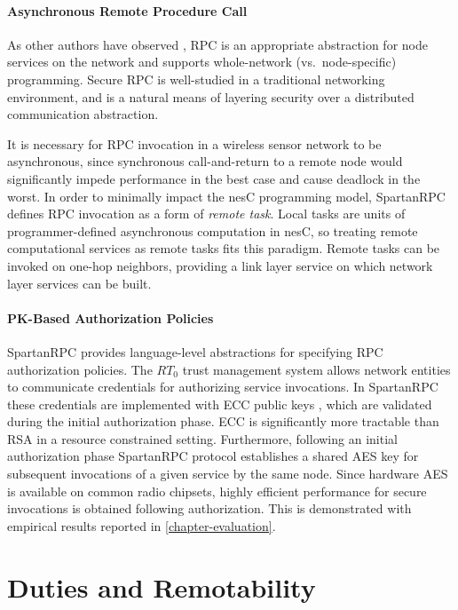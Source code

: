 \paragraph{Asynchronous Remote Procedure Call} As other authors have observed
\cite{may-tinyrpc-2007}, RPC is an appropriate abstraction for node services on the network and
supports whole-network (vs.~node-specific) programming. Secure RPC is well-studied in a
traditional networking environment, and is a natural means of layering security over a
distributed communication abstraction.

It is necessary for RPC invocation in a wireless sensor network to be asynchronous, since
synchronous call-and-return to a remote node would significantly impede performance in the best
case and cause deadlock in the worst. In order to minimally impact the nesC programming model,
SpartanRPC defines RPC invocation as a form of \emph{remote task}. Local tasks are units of
programmer-defined asynchronous computation in nesC, so treating remote computational services
as remote tasks fits this paradigm. Remote tasks can be invoked on one-hop neighbors, providing
a link layer service on which network layer services can be built.

\paragraph{PK-Based Authorization Policies} SpartanRPC provides language-level abstractions for
specifying RPC authorization policies. The $RT_0$ trust management system allows network
entities to communicate credentials for authorizing service invocations. In SpartanRPC these
credentials are implemented with ECC public keys \cite{bertoni-2006}, which are validated during
the initial authorization phase. ECC is significantly more tractable than RSA in a resource
constrained setting. Furthermore, following an initial authorization phase SpartanRPC protocol
establishes a shared AES key for subsequent invocations of a given service by the same node.
Since hardware AES is available on common radio chipsets, highly efficient performance
for secure invocations is obtained following authorization. This is demonstrated with empirical results
reported in \autoref{chapter-evaluation}.

\section{Duties and Remotability}
\label{section-duties}

